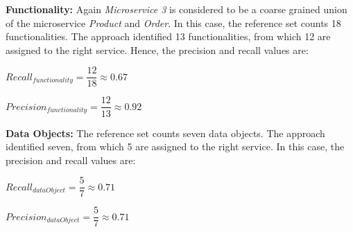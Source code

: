 \noindent
\textbf{Functionality:} Again \textit{Microservice 3} is considered to be a coarse grained union of the microservice \textit{Product} and \textit{Order}. In this case, the reference set counts 18 functionalities. The approach identified 13 functionalities, from which 12 are assigned to the right service. Hence, the precision and recall values are:

\hspace{1cm}
\noindent
\begin{minipage}{.4\linewidth}
	\vspace{0.5cm}
	\flushleft
	
	
	$Recall_{functionality}=\dfrac{12}{18} \approx 0.67  $
	\vspace{0.5cm}
	
\end{minipage}%
\begin{minipage}{.5\linewidth}
	\vspace{0.5cm}
	\flushleft
	
	
	$Precision_{functionality}=\dfrac{12}{13} \approx 0.92  $
	\vspace{0.5cm}
	
\end{minipage}


\noindent
\textbf{Data Objects:} The reference set counts seven data objects. The approach identified seven, from which 5 are assigned to the right service. In this case, the precision and recall values are:


\hspace{1cm}
\noindent
\begin{minipage}{.4\linewidth}
	\vspace{0.5cm}
	\flushleft
	
	
	$Recall_{dataObject}=\dfrac{5}{7} \approx 0.71  $
	\vspace{0.5cm}
	
\end{minipage}%
\begin{minipage}{.5\linewidth}
	\vspace{0.5cm}
	\flushleft
	
	
	$Precision_{dataObject}=\dfrac{5}{7} \approx 0.71  $
	\vspace{0.5cm}
	
\end{minipage}


